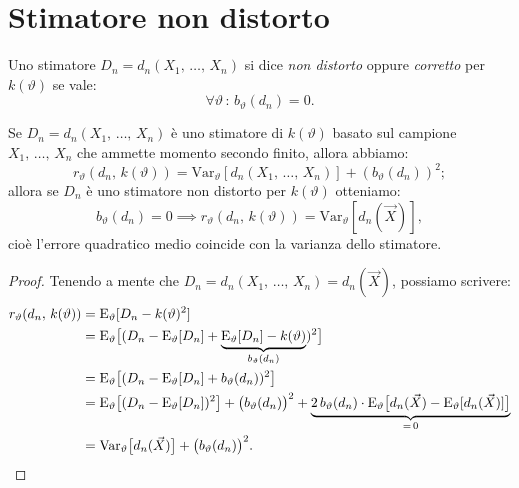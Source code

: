     \section{Stimatore non distorto}
        \begin{defn}
            Uno stimatore $D_n = d_n(X_1,\, \ldots,\, X_{n})$ si dice \emph{non distorto} oppure 
            \emph{corretto} per $k(\vartheta)$ se vale: \[
                \forall \vartheta \,:\, b_{\vartheta}(d_n) = 0
            .\]
        \end{defn}
        \begin{prty}
            Se $D_n = d_n(X_1,\, \ldots,\, X_{n})$ è uno stimatore di $k(\vartheta)$ basato sul campione 
             $X_1,\, \ldots,\, X_{n}$ che ammette momento secondo finito, allora abbiamo: \[
                 r_{\vartheta}(d_n,\, k(\vartheta)) = 
                 \text{Var}_{\vartheta}[d_n(X_1,\, \ldots,\, X_{n})] + (b_{\vartheta}(d_n))^2
             ;\] allora se $D_n$ è uno stimatore non distorto per $k(\vartheta)$ otteniamo: \[
                b_{\vartheta}(d_n) = 0 \implies r_{\vartheta}(d_n,\, k(\vartheta)) = 
                \text{Var}_{\vartheta}[d_n(\vec{X})]
             ,\] cioè l'errore quadratico medio coincide con la varianza dello stimatore.
        \end{prty}
        \begin{proof}
            Tenendo a mente che $D_n = d_n(X_1,\, \ldots,\, X_{n}) = d_n(\vec{X})$, possiamo scrivere:
            \begin{align*}
                r_{\vartheta}(d_n,\, k(\vartheta)) &= \text{E}_{\vartheta}[D_n -k(\vartheta)^2] \\
                &= \text{E}_{\vartheta}\big[(D_n - \text{E}_{\vartheta}[D_n] + \underset{b_{\vartheta}(d_n)}{\underbrace{\text{E}_{\vartheta}[D_n] - k(\vartheta)}})^2\big] \\
                &= \text{E}_{\vartheta}\big[(D_n - \text{E}_{\vartheta}[D_n] + b_{\vartheta}(d_n))^2\big] \\
                &= \text{E}_{\vartheta}\big[(D_n - \text{E}_{\vartheta}[D_n])^2\big] +
                \big(b_{\vartheta}(d_n)\big)^2 +
                \underset{=\, 0}{\underbrace{2\,b_{\vartheta}(d_n) \cdot \text{E}_{\vartheta}\big[d_n(\vec{X}) - \text{E}_{\vartheta}[d_n(\vec{X})]\big]}} \\
                &= \text{Var}_{\vartheta}\big[d_n(\vec{X})\big] + \big(b_{\vartheta}(d_n)\big)^2
            .\qedhere\end{align*}
        \end{proof}
    \pagebreak %
